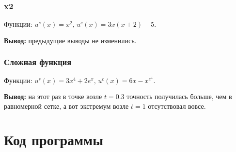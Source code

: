 \subsubsection{x2}

Функции: $u^s(x) = x^2$, $u^c(x) = 3x(x+2)-5$.


\noindent\textbf{Вывод:} предыдущие выводы не изменились.

\subsubsection{Сложная функция}

Функции: $u^s(x) = 3x^4 + 2e^x$, $u^c(x) = 6x-x^{e^x}$.


\noindent\textbf{Вывод:} на этот раз в точке возле $t=0.3$ точность получилась больше, чем в равномерной сетке, а вот экстремум возле $t=1$ отсутствовал вовсе.

\section{Код программы}

